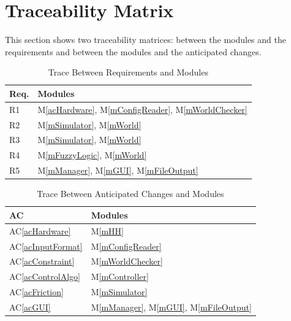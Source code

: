 \documentclass[12pt, titlepage]{article}
\newcommand{\acref}[1]{AC\ref{#1}}
\newcommand{\mref}[1]{M\ref{#1}}
\begin{document}

\section{Traceability Matrix} \label{SecTM}

This section shows two traceability matrices: between the modules and the
requirements and between the modules and the anticipated changes.

\begin{table}[H]
\centering
\begin{tabular}{p{} p{}}
\toprule
\textbf{Req.} & \textbf{Modules}\\
\midrule
R1 & \mref{acHardware}, \mref{mConfigReader}, \mref{mWorldChecker}\\
R2 & \mref{mSimulator}, \mref{mWorld}\\
R3 & \mref{mSimulator}, \mref{mWorld}\\
R4 & \mref{mFuzzyLogic}, \mref{mWorld}\\
R5 & \mref{mManager}, \mref{mGUI}, \mref{mFileOutput}\\
\bottomrule
\end{tabular}
\caption{Trace Between Requirements and Modules}
\label{TblRT}
\end{table}

\begin{table}[H]
\centering
\begin{tabular}{p{} p{}}
\toprule
\textbf{AC} & \textbf{Modules}\\
\midrule
\acref{acHardware} & \mref{mHH}\\
\acref{acInputFormat} & \mref{mConfigReader}\\
\acref{acConstraint} & \mref{mWorldChecker}\\
\acref{acControlAlgo} & \mref{mController}\\
\acref{acFriction} & \mref{mSimulator}\\
\acref{acGUI} & \mref{mManager}, \mref{mGUI}, \mref{mFileOutput}\\
\bottomrule
\end{tabular}
\caption{Trace Between Anticipated Changes and Modules}
\label{TblACT}
\end{table}
\end{document}
